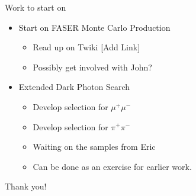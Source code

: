 \begin{frame}{Work to start on}
    \begin{itemize}
        \item Start on FASER Monte Carlo Production 
        \begin{itemize}
            \item Read up on Twiki [Add Link]
            \item Possibly get involved with John?
        \end{itemize}
        \item Extended Dark Photon Search
        \begin{itemize}
            \item Develop selection for $\mu^+ \mu^-$
            \item Develop selection for $\pi^+ \pi^-$
            \item Waiting on the samples from Eric
            \item Can be done as an exercise for earlier work. 
        \end{itemize}
    \end{itemize}
\end{frame}

\begin{frame}
    \centering
    \Large Thank you!
\end{frame}
